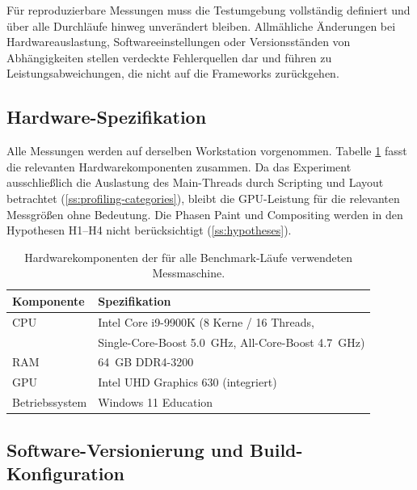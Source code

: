 Für reproduzierbare Messungen muss die Testumgebung vollständig definiert und über alle Durchläufe hinweg unverändert bleiben. Allmähliche Änderungen bei Hardwareauslastung, Softwareeinstellungen oder Versionsständen von Abhängigkeiten stellen verdeckte Fehlerquellen dar und führen zu Leistungsabweichungen, die nicht auf die Frameworks zurückgehen.

\subsection{Hardware-Spezifikation}
\label{ss:hardware}

Alle Messungen werden auf derselben Workstation vorgenommen. Tabelle \ref{tab:hardware} fasst die relevanten Hardwarekomponenten zusammen. Da das Experiment ausschließlich die Auslastung des Main-Threads durch Scripting und Layout betrachtet (\cref{ss:profiling-categories}), bleibt die GPU-Leistung für die relevanten Messgrößen ohne Bedeutung. Die Phasen Paint und Compositing werden in den Hypothesen H1–H4 nicht berücksichtigt (\cref{ss:hypotheses}).
\begin{table}[htbp]
	\centering
	\caption[Hardware-Spezifikation der Messmaschine]{Hardwarekomponenten der für alle Benchmark-Läufe verwendeten Messmaschine.}
	\label{tab:hardware}
	\begin{tabular}{ll}
		\hline
		Komponente       & Spezifikation \\
		\hline
		CPU              & Intel Core i9-9900K (8 Kerne / 16 Threads, \\ 
                         & Single-Core-Boost \qty{5,0}{GHz}, All-Core-Boost \qty{4,7}{GHz}) \\   
		RAM              & \qty{64}{GB} DDR4-3200 \\
		GPU              & Intel UHD Graphics 630 (integriert) \\
		Betriebssystem   & Windows 11 Education \\
		\hline
	\end{tabular}
\end{table}

\subsection{Software-Versionierung und Build-Konfiguration}
\label{ss:software-versions}

